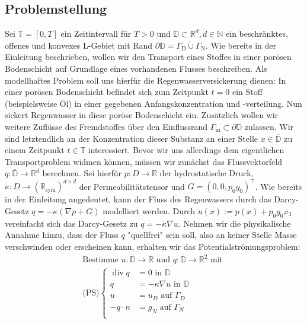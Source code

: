 \documentclass[12pt,a4paper]{scrartcl}
\numberwithin{equation}{section}
\newcommand{\R}{\mathbb{R}} %
\newcommand{\N}{\mathbb{N}} %
\DeclareMathOperator{\dive}{div}
\begin{document}
\subsection{Problemstellung}
Sei $\mathbb{T} = [0,T]$ ein Zeitintervall für $T>0$ und $\mathbb{D} \subset \R^d , d \in \N$ ein beschränktes, offenes und konvexes L-Gebiet mit Rand $ \partial \mathbb{D} = \Gamma_{\text{D}}  \dot{\cup} \Gamma_{\text{N}} $. 
Wie bereits in der Einleitung beschrieben, wollen wir den Transport eines Stoffes in einer porösen Bodenschicht auf Grundlage eines vorhandenen Flusses beschreiben. 
Als modellhaftes Problem soll uns hierfür die Regenwasserversickerung dienen: In einer porösen Bodenschicht befindet sich zum Zeitpunkt $t=0$ ein Stoff (beispielsweise Öl) in einer gegebenen Anfangskonzentration und -verteilung. Nun sickert Regenwasser in diese poröse Bodenschicht ein. Zusätzlich wollen wir weitere Zuflüsse des Fremdstoffes über den Einflussrand $\Gamma_{\text{in}} \subset \partial \mathbb{D}$ zulassen.
Wir sind letztendlich an der Konzentration dieser Substanz an einer Stelle $x \in \overline{\mathbb{D}}$ zu einem Zeitpunkt $t \in \mathbb{T}$ interessiert. \newline
Bevor wir uns allerdings dem eigentlichen Transportproblem widmen können, müssen wir zunächst das Flussvektorfeld $q: \overline{\mathbb{D}} \rightarrow \R^d$ berechnen. \newline
Sei hierfür $p: D \rightarrow \R$ der hydrostatische Druck, $\kappa: D \rightarrow (\R_{\text{sym}})^{d \times d}$ der Permeabilitätstensor und $G=(0,0,p_0 g_0)^{\top}$. 
Wie bereits in der Einleitung angedeutet, kann der Fluss des Regenwassers durch das Darcy-Gesetz $q=-\kappa(\nabla p + G)$ modelliert werden.
Durch $u(x) := p(x) + p_0 g_0 x_3$ vereinfacht sich das Darcy-Gesetz zu $q=-\kappa \nabla u$.\newline
Nehmen wir die physikalische Annahme hinzu, dass der Fluss $q$ "quellfrei" sein soll, also an keiner Stelle Masse verschwinden oder erscheinen kann, erhalten wir das Potentialströmungsproblem:
\begin{gather*}
\text{Bestimme } u:\overline{\mathbb{D}} \to \R \text{ und } q: \overline{\mathbb{D}} \to \R^2 \text{ mit } \\
\text{(PS)}\begin{cases}
\dive q &= 0 \text{ in } \mathbb{D}\\
q &= - \kappa \nabla u \text{ in } \mathbb{D}\\
u &= u_D \text{ auf } \Gamma_D \\
-q \cdot n &= g_N \text{ auf } \Gamma_N \\
\end{cases}
\end{gather*} 
\end{document}
